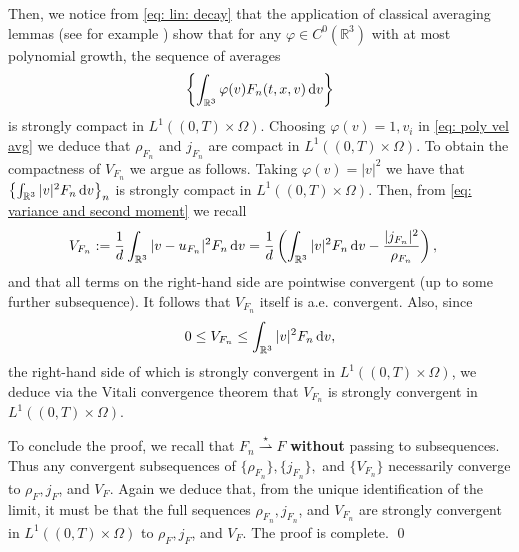 \documentclass[10pt, reqno]{amsart}
\theoremstyle{plain}
\theoremstyle{definition}
\theoremstyle{remark}
\renewenvironment{proof}[1][\proofname]{\noindent{\scshape #1.\quad}}{\qed}
\numberwithin{equation}{section}
\newcommand{\R}{\mathbb{R}}
\newcommand{\dv}{\textnormal{d}v}
\newcommand{\weakstarto}{\overset{\star}{\rightharpoonup}}
\newcommand{\lt}{\left}
\newcommand{\rt}{\right}
\begin{document}
\begin{proof}
Then, we notice from \eqref{eq: lin: decay} that the application of classical averaging lemmas (see for example \cite{dipernalionsMaxwell1989, DipernaLionsMeyer, perthamesouganidis}) show that for any $\varphi \in C^0(\R^3)$ with at most polynomial growth, the sequence of averages
    \begin{align}\label{eq: poly vel avg}
        \left\{\int_{\R^3} \varphi(v) F_n(t,x,v)\,\dv \right\}
    \end{align}
    is strongly compact in $L^1((0,T)\times\Omega)$. Choosing $\varphi(v) = 1,v_i$ in \eqref{eq: poly vel avg} we deduce that $\rho_{F_n}$ and $j_{F_n}$ are compact in $L^1((0,T)\times\Omega)$. To obtain the compactness of $V_{F_n}$ we argue as follows. Taking $\varphi(v) = |v|^2$ we have that $\left\{\int_{\R^3} |v|^2 F_n\,\dv\right\}_n$ is strongly compact in $L^1((0,T)\times\Omega)$. Then, from \eqref{eq: variance and second moment} we recall
    \begin{align*}
        V_{F_n} &:= \frac{1}{d} \int_{\R^3} |v - u_{F_n}|^2 F_n\,\dv  = \frac{1}{d}\lt( \int_{\R^3} |v|^2 F_n\,\dv - \frac{|j_{F_n}|^2}{\rho_{F_n}} \rt),
    \end{align*}
    and that all terms on the right-hand side are pointwise convergent (up to some further subsequence). It follows that $V_{F_n}$ itself is a.e. convergent. Also, since
    \begin{align*}
        0 \le V_{F_n} \le \int_{\R^3} |v|^2 F_n\,\dv,
    \end{align*}
    the right-hand side of which is strongly convergent in $L^1((0,T)\times\Omega)$, we deduce via the Vitali convergence theorem that $V_{F_n}$ is strongly convergent in $L^1((0,T)\times\Omega)$.
    
    To conclude the proof, we recall that $F_n\weakstarto F$ \textbf{without} passing to subsequences. Thus any convergent subsequences of $\{\rho_{F_n}\}, \{j_{F_n}\},$ and $\{V_{F_n}\}$ necessarily converge to $\rho_F, j_F$, and $V_F$. Again we deduce that, from the unique identification of the limit, it must be that the full sequences $\rho_{F_n}, j_{F_n}$, and $V_{F_n}$ are strongly convergent in $L^1((0,T)\times\Omega)$ to $\rho_F, j_F$, and $V_F$. The proof is complete.
\end{proof}
\end{document}
